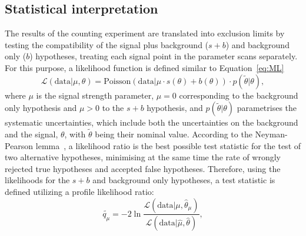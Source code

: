 \subsection{Statistical interpretation}
The results of the counting experiment are translated into exclusion limits by testing the compatibility of the signal plus background ($s+b$) and background only ($b$) hypotheses, treating each signal point in the parameter scans separately. For this purpose, a likelihood function is defined similar to Equation~\ref{eq:ML}~\cite{HiggsTool1}
\begin{equation}
\label{eq:like}
\mathcal{L}(\text{data}|\mu,\theta) = \text{Poisson}\left(\text{data}|\mu\cdot s\left(\theta\right) + b\left(\theta\right)\right)\cdot p\left(\tilde{\theta}|\theta\right),
\end{equation}
where $\mu$ is the signal strength parameter, $\mu = 0$ corresponding to the background only hypothesis and $\mu > 0$ to the  $s+b$ hypothesis, and $p(\tilde{\theta}|\theta)$ parametrises the systematic uncertainties, which include both the uncertainties on the background and the signal, $\theta$, with $\tilde{\theta}$ being their nominal value. According to the Neyman-Pearson lemma~\cite{NeymanPearson}, a likelihood ratio is the best possible test statistic for the test of two alternative hypotheses, minimising at the same time the rate of wrongly rejected true hypotheses and accepted false hypotheses. Therefore, using the likelihoods for the $s+b$ and background only hypotheses, a test statistic is defined utilizing a profile likelihood ratio: 
\begin{equation*}
\tilde{q_{\mu}} = -2 \ln\frac{\mathcal{L}\left(\text{data}|\mu,\hat{\theta}_\mu\right)}{\mathcal{L}\left(\text{data}|\hat{\mu},\hat{\theta}\right)},
\end{equation*}

